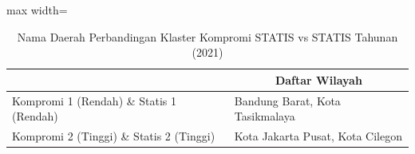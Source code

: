 \begin{table}[H]
\centering
\caption{Nama Daerah Perbandingan Klaster Kompromi STATIS vs STATIS Tahunan (2021)} \label{tab:sample2comp_statis_name_2021}
\begin{adjustbox}{max width=\textwidth}
\begin{tabular}{|>{\centering\arraybackslash}p{4cm}|p{10cm}|}
\hline
\multicolumn{1}{|c|}{\textbf{Kategori}} & \multicolumn{1}{c|}{\textbf{Daftar Wilayah}} \\
\hline
Kompromi 1 (Rendah) \& Statis 1 (Rendah) & Bandung Barat, Kota Tasikmalaya \\
\hline
Kompromi 2 (Tinggi) \& Statis 2 (Tinggi) & Kota Jakarta Pusat, Kota Cilegon \\
\hline
\end{tabular}
\end{adjustbox}
\end{table}